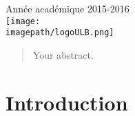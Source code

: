 \begin{titlepage}


{\large Année académique 2015-2016}\\[2cm] %


\texttt{[image: \\imagepath/logoULB.png]}\\[1cm] %
 

\vfill %

\end{titlepage}

\renewcommand{\cftsecleader}{\cftdotfill{\cftdotsep}}
\tableofcontents
\newpage

\pagestyle{fancy}

\setlength\headheight{15pt}
\renewcommand{\sectionmark}[1]{\markright{ #1}}
\renewcommand{\headrulewidth}{0.5pt}
\pagestyle{fancy}
\fancyhead[C]{} 
\fancyhead[RO]{\rightmark}
\fancyfoot[C]{}

\begin{abstract}
Your abstract.
\end{abstract}

\section{Introduction}




